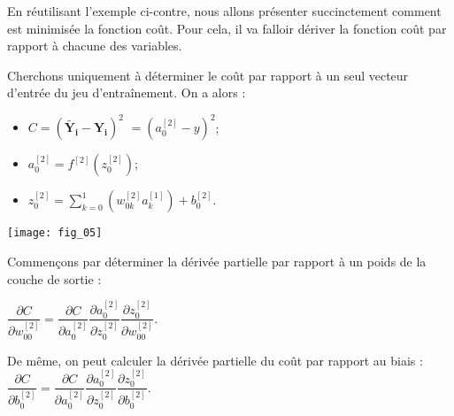 \begin{minipage}[c]{.55\linewidth}
En réutilisant l'exemple ci-contre, nous allons présenter succinctement comment est minimisée la fonction coût.
Pour cela, il va falloir dériver la fonction coût par rapport à chacune des variables. 

Cherchons uniquement à déterminer le coût par rapport à un seul vecteur d'entrée du jeu d'entraînement. On a alors : 
\begin{itemize}
\item $C = \left( \mathbf{\tilde{Y_i}} - \mathbf{Y_i}  \right)^2$ $= \left( a^{[2]}_{0} - y  \right)^2$;
\item $ a^{[2]}_{0} = f^{[2]}\left(z_0^{[2]}\right)$;
\item $z_0^{[2]} =\sum\limits_{k=0}^{1}\left( w^{[2]}_{0k} a_k^{[1]} \right) + b^{[2]}_{0}$.
\end{itemize}

\end{minipage}\hfill
\begin{minipage}[c]{.4\linewidth}
\begin{center}
\texttt{[image: fig\_05]}
\end{center}
%
\end{minipage}


Commençons par déterminer la dérivée partielle par rapport à un poids de la couche de sortie : 

$\dfrac{\partial C}{\partial w^{[2]}_{00}}=\dfrac{\partial C}{\partial a^{[2]}_{0}}\dfrac{\partial  a^{[2]}_{0}}{\partial z^{[2]}_{0}}\dfrac{\partial z^{[2]}_{0}}{\partial w^{[2]}_{00}}$.

De même, on peut calculer la dérivée partielle du coût par rapport au biais : 
$\dfrac{\partial C}{\partial b^{[2]}_{0}}=\dfrac{\partial C}{\partial a^{[2]}_{0}}\dfrac{\partial  a^{[2]}_{0}}{\partial z^{[2]}_{0}}\dfrac{\partial z^{[2]}_{0}}{\partial b^{[2]}_{0}}$.

